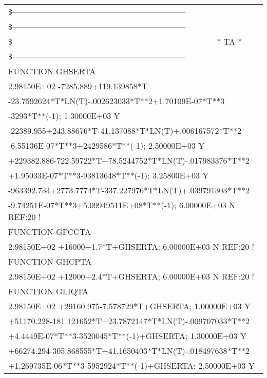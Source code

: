 \begin{longtable}[H]{ l l l }
	\multicolumn{3}{l}{\$---------------------------------------------------------------}\\
	\multicolumn{3}{l}{\$---------------------------------------------------------------}\\
	\$ & \multicolumn{2}{c}{* TA *}\\
	\multicolumn{3}{l}{\$---------------------------------------------------------------}\\
	FUNCTION GHSERTA & & \\
	\multicolumn{3}{l}{2.98150E+02  -7285.889+119.139858*T}\\
	\multicolumn{3}{l}{-23.7592624*T*LN(T)-.002623033*T**2+1.70109E-07*T**3}\\
	\multicolumn{3}{l}{-3293*T**(-1);  1.30000E+03  Y}\\
	\multicolumn{3}{l}{-22389.955+243.88676*T-41.137088*T*LN(T)+.006167572*T**2}\\
	\multicolumn{3}{l}{-6.55136E-07*T**3+2429586*T**(-1);  2.50000E+03  Y}\\
	\multicolumn{3}{l}{+229382.886-722.59722*T+78.5244752*T*LN(T)-.017983376*T**2}\\
	\multicolumn{3}{l}{+1.95033E-07*T**3-93813648*T**(-1);  3.25800E+03  Y}\\
	\multicolumn{3}{l}{-963392.734+2773.7774*T-337.227976*T*LN(T)+.039791303*T**2}\\
	\multicolumn{3}{l}{-9.74251E-07*T**3+5.09949511E+08*T**(-1); 6.00000E+03  N REF:20 !}\\
	FUNCTION GFCCTA & & \\
	\multicolumn{3}{l}{2.98150E+02  +16000+1.7*T+GHSERTA; 6.00000E+03  N REF:20 !}\\
	FUNCTION GHCPTA & & \\
	\multicolumn{3}{l}{2.98150E+02  +12000+2.4*T+GHSERTA;  6.00000E+03   N REF:20 !}\\
	FUNCTION GLIQTA & & \\
	\multicolumn{3}{l}{2.98150E+02  +29160.975-7.578729*T+GHSERTA;  
1.00000E+03  Y}\\
	\multicolumn{3}{l}{+51170.228-181.121652*T+23.7872147*T*LN(T)-.009707033*T**2}\\
	\multicolumn{3}{l}{+4.4449E-07*T**3-3520045*T**(-1)+GHSERTA;  1.30000E+03  Y}\\
	\multicolumn{3}{l}{+66274.294-305.868555*T+41.1650403*T*LN(T)-.018497638*T**2}\\
	\multicolumn{3}{l}{+1.269735E-06*T**3-5952924*T**(-1)+GHSERTA;  2.50000E+03  Y}\\

\end{longtable}
